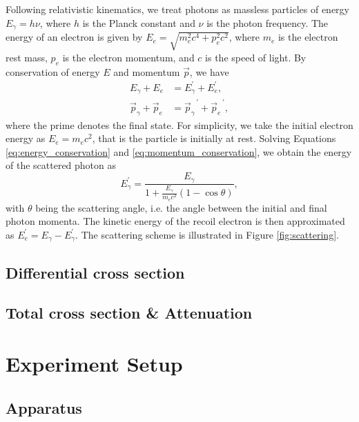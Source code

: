 \documentclass[aps,twocolumn,secnumarabic,balancelastpage,amsmath,amssymb,nofootinbib,floatfix]{revtex4-1}
\begin{document}
Following relativistic kinematics, we treat photons as massless particles of energy $E_\gamma = h \nu$, where $h$ is the Planck constant and $\nu$ is the photon frequency. The energy of an electron is given by $E_e = \sqrt{m_e^2 c^4 + p_e^2 c^2}$, where $m_e$ is the electron rest mass, $p_e$ is the electron momentum, and $c$ is the speed of light. By conservation of energy $E$ and momentum $\vec{p}$, we have
\begin{align}
    \label{eq:energy_conservation}
    E_\gamma + E_e &= E_\gamma^{\prime} + E_e^{\prime}, \\
    \label{eq:momentum_conservation}
    \vec{p}_\gamma + \vec{p}_e &= {\vec{p}_\gamma}^{\,\prime} + {\vec{p}_e}^{\,\prime},
\end{align}
where the prime denotes the final state. For simplicity, we take the initial electron energy as $E_e = m_e c^2$, that is the particle is initially at rest. Solving Equations \eqref{eq:energy_conservation} and \eqref{eq:momentum_conservation}, we obtain the energy of the scattered photon as
\begin{equation}
    \label{eq:scattered_photon_energy}
    E_\gamma^{\prime} = \frac{E_\gamma}{1 + \frac{E_\gamma}{m_e c^2} (1 - \cos \theta)},
\end{equation}
with $\theta$ being the scattering angle, i.e. the angle between the initial and final photon momenta. The kinetic energy of the recoil electron is then approximated as $E_e^{\prime} = E_\gamma - E_\gamma^{\prime}$. The scattering scheme is illustrated in Figure \ref{fig:scattering}.


\subsection{Differential cross section}
\label{ssec:differential_cross_section}



\subsection{Total cross section \& Attenuation}
\label{ssec:total_cross_section}




\section{Experiment Setup}
\label{sec:experiment}

\subsection{Apparatus}
\label{ssec:apparatus}
\end{document}

